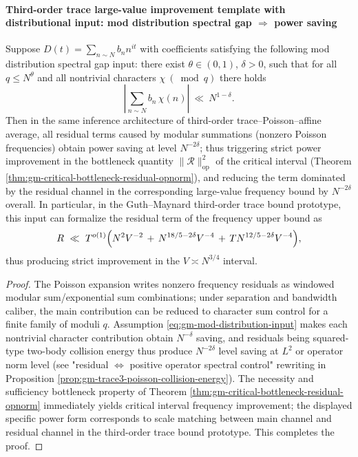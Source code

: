 \paragraph{Third-order trace large-value improvement template with distributional input: mod distribution spectral gap \texorpdfstring{$\Rightarrow$}{=>} power saving}
\begin{theorem}\label{thm:gm-trace3-improvement-from-mod-distribution}
Suppose \(D(t)=\sum_{n\sim N} b_n n^{it}\) with coefficients satisfying the following mod distribution spectral gap input: there exist \(\theta\in(0,1)\), \(\delta>0\), such that for all \(q\le N^\theta\) and all nontrivial characters \(\chi\ (\bmod q)\) there holds
\begin{equation}\label{eq:gm-mod-distribution-input}
\left|\sum_{n\sim N} b_n\,\chi(n)\right|\ \ll\ N^{1-\delta}.
\end{equation}
Then in the same inference architecture of third-order trace--Poisson--affine average, all residual terms caused by modular summations (nonzero Poisson frequencies) obtain power saving at level \(N^{-2\delta}\);
thus triggering strict power improvement in the bottleneck quantity \(\|\mathcal{R}\|_{\mathrm{op}}^2\) of the critical interval (Theorem \ref{thm:gm-critical-bottleneck-residual-opnorm}), and reducing the term dominated by the residual channel in the corresponding large-value frequency bound by \(N^{-2\delta}\) overall.
In particular, in the Guth--Maynard third-order trace bound prototype, this input can formalize the residual term of the frequency upper bound as
\[
R\ \ll\ T^{o(1)}
\Bigl(
N^2V^{-2}
\,+\,N^{18/5-2\delta}V^{-4}
\,+\,TN^{12/5-2\delta}V^{-4}
\Bigr),
\]
thus producing strict improvement in the \(V\asymp N^{3/4}\) interval.
\end{theorem}

\begin{proof}
The Poisson expansion writes nonzero frequency residuals as windowed modular sum/exponential sum combinations; under separation and bandwidth caliber, the main contribution can be reduced to character sum control for a finite family of moduli \(q\).
Assumption \eqref{eq:gm-mod-distribution-input} makes each nontrivial character contribution obtain \(N^{-\delta}\) saving, and residuals being squared-type two-body collision energy thus produce \(N^{-2\delta}\) level saving at \(L^2\) or operator norm level (see "residual \(\Leftrightarrow\) positive operator spectral control" rewriting in Proposition \ref{prop:gm-trace3-poisson-collision-energy}).
The necessity and sufficiency bottleneck property of Theorem \ref{thm:gm-critical-bottleneck-residual-opnorm} immediately yields critical interval frequency improvement; the displayed specific power form corresponds to scale matching between main channel and residual channel in the third-order trace bound prototype. This completes the proof.
\end{proof}

\endinput

